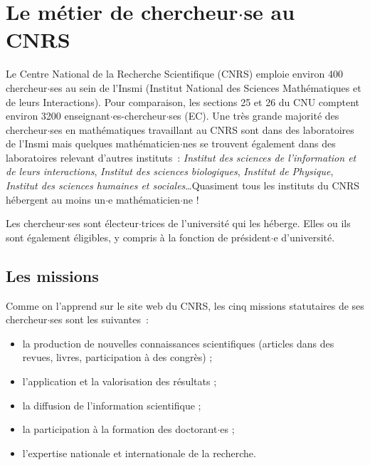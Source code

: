 

\chapter{Le m\'etier de chercheur$\cdot$se au CNRS}

Le Centre National de la Recherche Scientifique (CNRS) emploie
 environ 400 chercheur$\cdot$ses au sein de l'Insmi (Institut National des Sciences
 Math\'ematiques et de leurs Interactions).
Pour comparaison,
les sections 25 et 26 du CNU comptent environ 3200 enseignant$\cdot$es-chercheur$\cdot$ses (EC).
Une tr\`es grande majorit\'e des chercheur$\cdot$ses en math\'{e}matiques
travaillant au CNRS sont dans des laboratoires de l'Insmi mais quelques math\'ematicien$\cdot$nes se trouvent \'egalement dans des laboratoires relevant d'autres instituts~: {\it Institut des sciences de l'information et de leurs interactions}, {\it Institut des sciences biologiques}, {\it Institut de Physique}, {\it Institut des sciences humaines et sociales}\ldots Quasiment tous les instituts du CNRS h\'ebergent au moins un$\cdot$e math\'ematicien$\cdot$ne !

Les chercheur$\cdot$ses sont \'electeur$\cdot$trices de l'universit\'e qui les h\'eberge.
Elles ou ils sont \'egalement \'eligibles, y compris \`a la fonction de pr\'esident$\cdot$e d'universit\'e.



\section{Les missions}

Comme on l'apprend sur le site web du CNRS, les cinq missions statutaires de ses
chercheur$\cdot$ses  sont les suivantes~:
\begin{itemize}
\item la production de nouvelles connaissances scientifiques (articles dans des revues, livres, participation \`a des congr\`es) ;
\item l'application et  la valorisation des r\'esultats ;
\item la diffusion de l'information scientifique ;
\item la participation \`a la formation des doctorant$\cdot$es ;
\item l'expertise nationale et internationale de la recherche.
\end{itemize}

